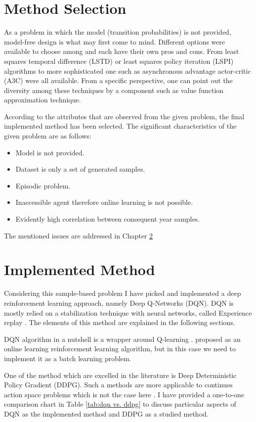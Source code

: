 \documentclass[12pt]{report}
\begin{document}
\chapter{Method Selection}
As a problem in which the model (transition probabilities) is not provided, model-free design is what may first come to mind. Different options were available to choose among and each have their own pros and cons. From least squares temporal difference (LSTD) \cite{Bradtke1996} or least squares policy iteration (LSPI) \cite{Lagoudakis2003} algorithms to more sophisticated one such as asynchronous advantage actor-critic (A3C) \cite{Mnih2016b} were all available. From a specific perspective, one can point out the diversity among these techniques by a component such as value function approximation technique.

According to the attributes that are observed from the given problem, the final implemented method has been selected. The significant characteristics of the given problem are as follows:
\begin{itemize}
    \item Model is not provided.
    \item Dataset is only a set of generated samples.
    \item Episodic problem.
    \item Inaccessible agent therefore online learning is not possible.
    \item Evidently high correlation between consequent year samples.
\end{itemize}

The mentioned issues are addressed in Chapter \ref{chap: implemented method}

\chapter{Implemented Method}
\label{chap: implemented method}
Considering this sample-based problem I have picked and implemented a deep reinforcement learning approach, namely Deep Q-Networks (DQN). DQN is mostly relied on a stabilization technique with neural networks, called Experience replay \cite{Mnih2015}. The elements of this method are explained in the following sections.

DQN algorithm in a nutshell is a wrapper around Q-learning \cite{Watkins1992}. proposed as an online learning reinforcement learning algorithm, but in this case we need to implement it as a batch learning problem.

One of the method which are excelled in the literature is Deep Deterministic Policy Gradient (DDPG). Such a methods are more applicable to continues action space problems which is not the case here \cite{Lillicrap2015}. I have provided a one-to-one comparison chart in Table \ref{tab:dqn vs. ddpg} to discuss particular aspects of DQN as the implemented method and DDPG as a studied method.
\end{document}
